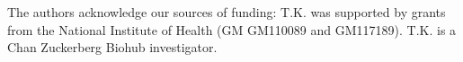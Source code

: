 The authors acknowledge our sources of funding:
T.K. was supported by grants from the National Institute of Health (GM GM110089 and GM117189). T.K. is a Chan Zuckerberg Biohub investigator.

